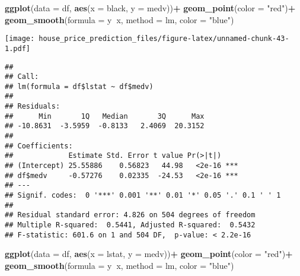 \documentclass[
]{article}
\newenvironment{Shaded}{\begin{snugshade}}{\end{snugshade}}
\newcommand{\DataTypeTok}[1]{\textcolor[rgb]{0.13,0.29,0.53}{#1}}
\newcommand{\KeywordTok}[1]{\textcolor[rgb]{0.13,0.29,0.53}{\textbf{#1}}}
\newcommand{\NormalTok}[1]{#1}
\newcommand{\OperatorTok}[1]{\textcolor[rgb]{0.81,0.36,0.00}{\textbf{#1}}}
\newcommand{\StringTok}[1]{\textcolor[rgb]{0.31,0.60,0.02}{#1}}
\begin{document}
\begin{Shaded}
\begin{Highlighting}[]
\KeywordTok{ggplot}\NormalTok{(}\DataTypeTok{data =}\NormalTok{ df, }\KeywordTok{aes}\NormalTok{(}\DataTypeTok{x =}\NormalTok{ black, }\DataTypeTok{y =}\NormalTok{ medv))}\OperatorTok{+}
\StringTok{  }\KeywordTok{geom_point}\NormalTok{(}\DataTypeTok{color =} \StringTok{"red"}\NormalTok{)}\OperatorTok{+}
\StringTok{  }\KeywordTok{geom_smooth}\NormalTok{(}\DataTypeTok{formula =}\NormalTok{ y}\OperatorTok{~}\NormalTok{x, }\DataTypeTok{method =}\NormalTok{ lm, }\DataTypeTok{color =} \StringTok{"blue"}\NormalTok{)}
\end{Highlighting}
\end{Shaded}

\texttt{[image: house\_price\_prediction\_files/figure-latex/unnamed-chunk-43-1.pdf]}

\begin{Shaded}
\end{Shaded}

\begin{verbatim}
## 
## Call:
## lm(formula = df$lstat ~ df$medv)
## 
## Residuals:
##      Min       1Q   Median       3Q      Max 
## -10.8631  -3.5959  -0.8133   2.4069  20.3152 
## 
## Coefficients:
##             Estimate Std. Error t value Pr(>|t|)    
## (Intercept) 25.55886    0.56823   44.98   <2e-16 ***
## df$medv     -0.57276    0.02335  -24.53   <2e-16 ***
## ---
## Signif. codes:  0 '***' 0.001 '**' 0.01 '*' 0.05 '.' 0.1 ' ' 1
## 
## Residual standard error: 4.826 on 504 degrees of freedom
## Multiple R-squared:  0.5441, Adjusted R-squared:  0.5432 
## F-statistic: 601.6 on 1 and 504 DF,  p-value: < 2.2e-16
\end{verbatim}

\begin{Shaded}
\begin{Highlighting}[]
\KeywordTok{ggplot}\NormalTok{(}\DataTypeTok{data =}\NormalTok{ df, }\KeywordTok{aes}\NormalTok{(}\DataTypeTok{x =}\NormalTok{ lstat, }\DataTypeTok{y =}\NormalTok{ medv))}\OperatorTok{+}
\StringTok{  }\KeywordTok{geom_point}\NormalTok{(}\DataTypeTok{color =} \StringTok{"red"}\NormalTok{)}\OperatorTok{+}
\StringTok{  }\KeywordTok{geom_smooth}\NormalTok{(}\DataTypeTok{formula =}\NormalTok{ y}\OperatorTok{~}\NormalTok{x, }\DataTypeTok{method =}\NormalTok{ lm, }\DataTypeTok{color =} \StringTok{"blue"}\NormalTok{)}
\end{Highlighting}
\end{Shaded}
\end{document}
